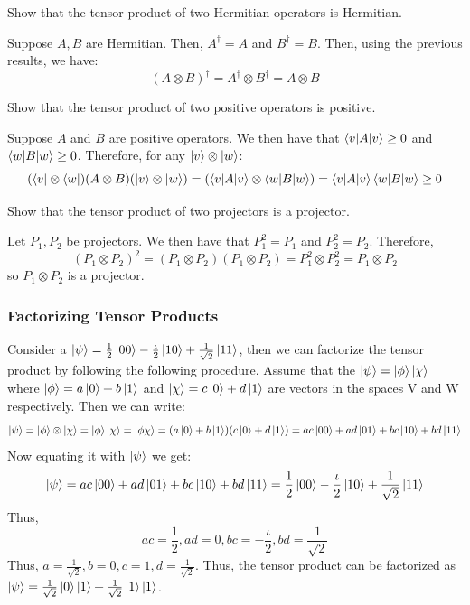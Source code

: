 \begin{example}
    Show that the tensor product of two Hermitian operators is Hermitian.

    Suppose $A,B$ are Hermitian. Then, $A^{\dagger}=A$ and $B^{\dagger}=B$. Then, using the previous results, we have:
    \[
    (A\otimes B)^{\dagger} = A^{\dagger} \otimes B^{\dagger} =A \otimes B
    \]
\end{example}
\begin{example}
    Show that the tensor product of two positive operators is positive.

    Suppose $A$ and $B$ are positive operators. We then have that $\braket{v|A|v}\geq 0$ and $\braket{w|B|w}\geq 0$. Therefore, for any $\ket{v}\otimes \ket{w}$:
    \[
    (\bra{v} \otimes \bra{w})(A \otimes B) (\ket{v} \otimes \ket{w})=(\braket{v|A|v} \otimes \braket{w|B|w})=\braket{v|A|v}\braket{w|B|w}\geq 0
    \]
\end{example}
\begin{example}
    Show that the tensor product of two projectors is a projector.

    
Let $P_1,P_2$ be projectors. We then have that $P_1^2=P_1$ and $P_2^2=P_2$. Therefore,
\[
(P_1\otimes P_2)^2=(P_1\otimes P_2)(P_1\otimes P_2)=P_1^2\otimes P_2^2=P_1 \otimes P_2
\]
so $P_1\otimes P_2$ is a projector.
\end{example}
\subsubsection{Factorizing Tensor Products}
Consider a $\ket{\psi}=\frac{1}{2}\ket{00}-\frac{\iota}{2}\ket{10}+\frac{1}{\sqrt{2}}\ket{11}$, then we can factorize the tensor product by following the following procedure.
Assume that the $\ket{\psi}=\ket{\phi}\ket{\chi}$ where $\ket{\phi}=a\ket{0}+b\ket{1}$ and $\ket{\chi}=c\ket{0}+d\ket{1}$ are vectors in the spaces V and W respectively. Then we can write:
\[ \ket{\psi}=\ket{\phi}\otimes \ket{\chi}=\ket{\phi}\ket{\chi}=\ket{\phi\chi}=(a\ket{0}+b\ket{1})(c\ket{0}+d\ket{1})=ac\ket{00}+ad\ket{01}+bc\ket{10}+bd\ket{11} \]
Now equating it with $\ket{\psi}$ we get:
\[ \ket{\psi}=ac\ket{00}+ad\ket{01}+bc\ket{10}+bd\ket{11}=\frac{1}{2}\ket{00}-\frac{\iota}{2}\ket{10}+\frac{1}{\sqrt{2}}\ket{11} \]
Thus,
\[ ac=\frac{1}{2}, ad=0, bc=-\frac{\iota}{2}, bd=\frac{1}{\sqrt{2}} \]
Thus, $a=\frac{1}{\sqrt{2}}, b=0, c=1, d=\frac{1}{\sqrt{2}}$. Thus, the tensor product can be factorized as $\ket{\psi}=\frac{1}{\sqrt{2}}\ket{0}\ket{1}+\frac{1}{\sqrt{2}}\ket{1}\ket{1}$.

